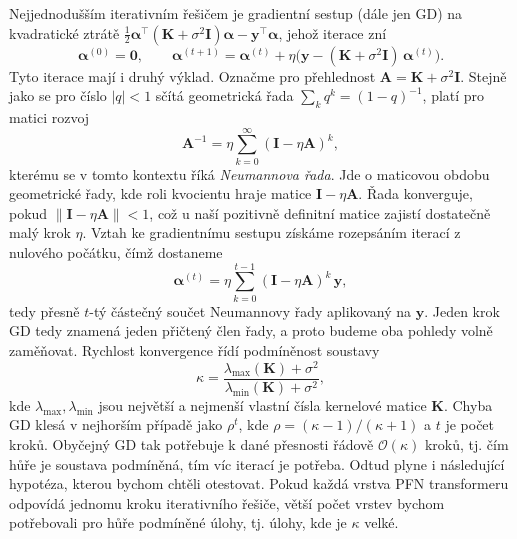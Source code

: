 Nejjednodušším iterativním řešičem je gradientní sestup (dále jen GD) na kvadratické ztrátě $\tfrac{1}{2}\boldsymbol{\alpha}^\top (\mathbf{K}+\sigma^2 \mathbf{I})\boldsymbol{\alpha} - \mathbf{y}^\top\boldsymbol{\alpha}$, jehož iterace zní
$$\boldsymbol{\alpha}^{(0)} = \mathbf{0}, \qquad \boldsymbol{\alpha}^{(t+1)} = \boldsymbol{\alpha}^{(t)} + \eta\bigl(\mathbf{y} - (\mathbf{K}+\sigma^2 \mathbf{I})\,\boldsymbol{\alpha}^{(t)}\bigr).$$
Tyto iterace mají i druhý výklad.
Označme pro přehlednost $\mathbf{A} = \mathbf{K}+\sigma^2 \mathbf{I}$.
Stejně jako se pro číslo $|q| < 1$ sčítá geometrická řada $\sum_{k} q^k = (1-q)^{-1}$, platí pro matici rozvoj
$$\mathbf{A}^{-1} = \eta \sum_{k=0}^{\infty} (\mathbf{I} - \eta \mathbf{A})^k,$$
kterému se v tomto kontextu říká \emph{Neumannova řada}.
Jde o maticovou obdobu geometrické řady, kde roli kvocientu hraje matice $\mathbf{I} - \eta\mathbf{A}$.
Řada konverguje, pokud $\|\mathbf{I} - \eta\mathbf{A}\| < 1$, což u naší pozitivně definitní matice zajistí dostatečně malý krok $\eta$.
Vztah ke gradientnímu sestupu získáme rozepsáním iterací z nulového počátku, čímž dostaneme
$$\boldsymbol{\alpha}^{(t)} = \eta \sum_{k=0}^{t-1} (\mathbf{I} - \eta \mathbf{A})^k\, \mathbf{y},$$
tedy přesně $t$-tý částečný součet Neumannovy řady aplikovaný na $\mathbf{y}$.
Jeden krok GD tedy znamená jeden přičtený člen řady, a proto budeme oba pohledy volně zaměňovat.
Rychlost konvergence řídí podmíněnost soustavy
$$\kappa = \frac{\lambda_{\max}(\mathbf{K}) + \sigma^2}{\lambda_{\min}(\mathbf{K}) + \sigma^2},$$
kde $\lambda_{\max}, \lambda_{\min}$ jsou největší a nejmenší vlastní čísla kernelové matice $\mathbf{K}$.
Chyba GD klesá v nejhorším případě jako $\rho^t$, kde $\rho = (\kappa-1)/(\kappa+1)$ a $t$ je počet kroků.
Obyčejný GD tak potřebuje k dané přesnosti řádově $\mathcal{O}(\kappa)$ kroků, tj. čím hůře je soustava podmíněná, tím víc iterací je potřeba.
Odtud plyne i následující hypotéza, kterou bychom chtěli otestovat.
Pokud každá vrstva PFN transformeru odpovídá jednomu kroku iterativního řešiče, větší počet vrstev bychom potřebovali pro hůře podmíněné úlohy, tj. úlohy, kde je $\kappa$ velké.
\par

